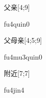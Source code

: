 \begin{verbete}[fu4qin0]{父亲}[4;9]
\begin{pronuncia}{fu4quin0}
\end{pronuncia}
\end{verbete}

\begin{verbete}[fu4mu3qin0]{父母亲}[4;5;9]
\begin{pronuncia}{fu4mu3quin0}
\end{pronuncia}
\end{verbete}

\begin{verbete}[fu4jin4]{附近}[7;7]
\begin{pronuncia}{fu4jin4}
\end{pronuncia}
\end{verbete}

